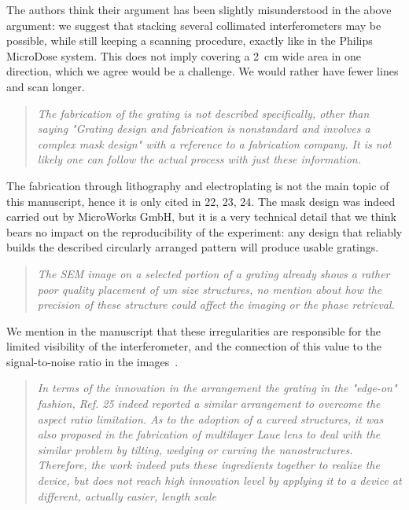 \documentclass[a4paper,english]{scrartcl}
\newenvironment{reviewerquote}{\begin{quote}\itshape}{\end{quote}}
\begin{document}
The authors think their argument has been slightly misunderstood in the
above argument: we suggest that stacking several collimated interferometers
may be possible,
while still keeping a scanning procedure, exactly like in the Philips
MicroDose system.
This does not imply covering a \SI{2}{\centi\meter} wide area in one direction,
which we agree would be a challenge. We would rather
have fewer lines and scan longer.

\begin{reviewerquote}
The fabrication of the grating is not described specifically,
other than saying "Grating design and fabrication is nonstandard and
involves a complex mask design" with a reference to a fabrication company.
It is not likely one can follow the actual process with just these
information. 
\end{reviewerquote}

The fabrication through lithography and electroplating is not
the main topic of this manuscript, hence it is only cited in 22, 23, 24. The
mask design was indeed carried out by MicroWorks GmbH, but it is a very technical
detail that we think bears no impact on the reproducibility of the
experiment: any design that reliably builds the described circularly
arranged pattern will produce usable gratings.

\begin{reviewerquote}
The SEM image on a selected portion of a grating already shows a
rather poor quality placement of um size structures, no mention about how
the precision of these structure could affect the imaging or the phase
retrieval.
\end{reviewerquote}

We mention in the manuscript that these irregularities are
responsible for the limited visibility of the interferometer, and the
connection of this value to the signal-to-noise ratio in the
images~\cite{Raupach2011}.

\begin{reviewerquote}
In terms of the innovation in the arrangement the grating in the
"edge-on" fashion, Ref. 25 indeed reported a similar arrangement to overcome
the aspect ratio limitation. As to the adoption of a curved structures, it
was also proposed in the fabrication of multilayer Laue lens to deal with
the similar problem by tilting, wedging or curving the nanostructures.
Therefore, the work indeed puts these ingredients together to realize the
device, but does not reach high innovation level by applying it to a device
at different, actually easier, length scale
\end{reviewerquote}
\end{document}
